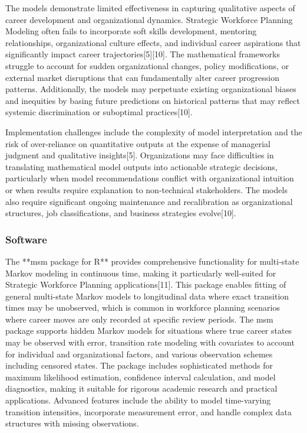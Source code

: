 \documentclass[main.tex]{subfiles}
\begin{document}
The models demonstrate limited effectiveness in capturing qualitative aspects of career development and organizational dynamics. Strategic Workforce Planning Modeling often fails to incorporate soft skills development, mentoring relationships, organizational culture effects, and individual career aspirations that significantly impact career trajectories[5][10]. The mathematical frameworks struggle to account for sudden organizational changes, policy modifications, or external market disruptions that can fundamentally alter career progression patterns. Additionally, the models may perpetuate existing organizational biases and inequities by basing future predictions on historical patterns that may reflect systemic discrimination or suboptimal practices[10].

Implementation challenges include the complexity of model interpretation and the risk of over-reliance on quantitative outputs at the expense of managerial judgment and qualitative insights[5]. Organizations may face difficulties in translating mathematical model outputs into actionable strategic decisions, particularly when model recommendations conflict with organizational intuition or when results require explanation to non-technical stakeholders. The models also require significant ongoing maintenance and recalibration as organizational structures, job classifications, and business strategies evolve[10].

\subsubsection{Software}

The **msm package for R** provides comprehensive functionality for multi-state Markov modeling in continuous time, making it particularly well-suited for Strategic Workforce Planning applications[11]. This package enables fitting of general multi-state Markov models to longitudinal data where exact transition times may be unobserved, which is common in workforce planning scenarios where career moves are only recorded at specific review periods. The msm package supports hidden Markov models for situations where true career states may be observed with error, transition rate modeling with covariates to account for individual and organizational factors, and various observation schemes including censored states. The package includes sophisticated methods for maximum likelihood estimation, confidence interval calculation, and model diagnostics, making it suitable for rigorous academic research and practical applications. Advanced features include the ability to model time-varying transition intensities, incorporate measurement error, and handle complex data structures with missing observations.
\end{document}
